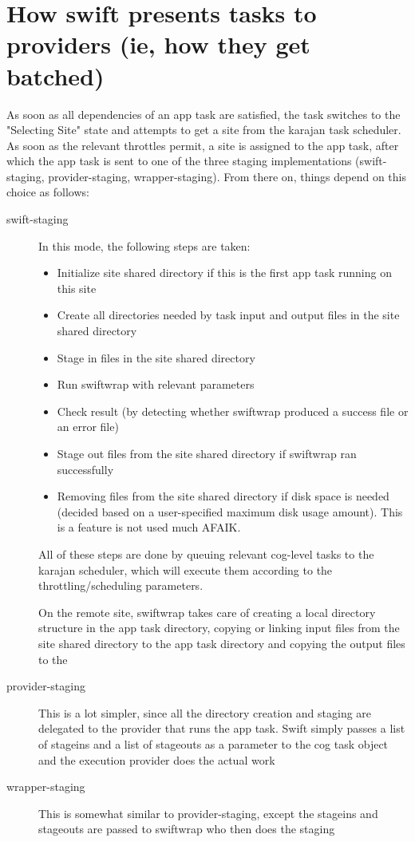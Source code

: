 \documentclass[12pt,letterpaper]{report}
\begin{document}
\label{s:tasks}
\section{How swift presents tasks to providers (ie, how they get batched)}

As soon as all dependencies of an app task are satisfied, the task switches to the "Selecting Site" state and attempts to get a site from the karajan task scheduler. As soon as the relevant throttles permit, a site is assigned to the app task, after which the app task is sent to one of the three staging implementations (swift-staging, provider-staging, wrapper-staging). From there on, things depend on this choice as follows:
	\begin{description}
		\item[swift-staging] In this mode, the following steps are taken:
			\begin{itemize}
				\item Initialize site shared directory if this is the first app task running on this site
				\item Create all directories needed by task input and output files in the site shared directory
				\item Stage in files in the site shared directory
				\item Run swiftwrap with relevant parameters
				\item Check result (by detecting whether swiftwrap produced a success file or an error file)
				\item Stage out files from the site shared directory if swiftwrap ran successfully
				\item Removing files from the site shared directory if disk space is needed (decided based on a user-specified maximum disk usage amount). This is a feature is not used much AFAIK.
			\end{itemize}
			
			All of these steps are done by queuing relevant cog-level tasks to the karajan scheduler, which will execute them according to the throttling/scheduling parameters.
			
			On the remote site, swiftwrap takes care of creating a local directory structure in the app task directory, copying or linking input files from the site shared directory to the app task directory and copying the output files to the 
			
		\item[provider-staging] This is a lot simpler, since all the directory creation and staging are delegated to the provider that runs the app task. Swift simply passes a list of stageins and a list of stageouts as a parameter to the cog task object and the execution provider does the actual work
		
		\item[wrapper-staging] This is somewhat similar to provider-staging, except the stageins and stageouts are passed to swiftwrap who then does the staging
	\end{description}
\end{document}
